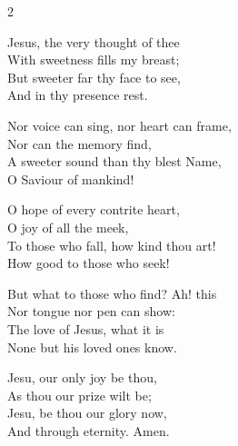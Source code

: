 \begin{multicols}{2}
\raggedcolumns
\begin{enpars}
Jesus, the very thought of thee\\
With sweetness fills my breast;\\
But sweeter far thy face to see,\\
And in thy presence rest.

Nor voice can sing, nor heart can frame,\\
Nor can the memory find,\\
A sweeter sound than thy blest Name,\\
O Saviour of mankind!

O hope of every contrite heart,\\
O joy of all the meek,\\
To those who fall, how kind thou art!\\
How good to those who seek!

But what to those who find? Ah! this\\
Nor tongue nor pen can show:\\
The love of Jesus, what it is\\
None but his loved ones know.

Jesu, our only joy be thou,\\
As thou our prize wilt be;\\
Jesu, be thou our glory now,\\
And through eternity.
Amen.\end{enpars}\end{multicols}